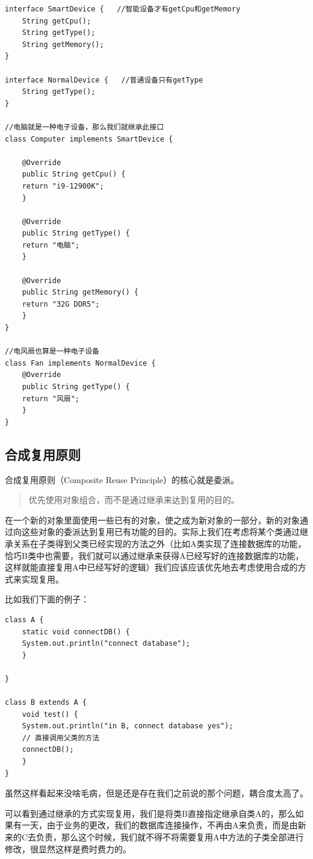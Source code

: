 \documentclass[11pt]{article}
\begin{document}
\begin{verbatim}
interface SmartDevice {   //智能设备才有getCpu和getMemory
    String getCpu();
    String getType();
    String getMemory();
}

interface NormalDevice {   //普通设备只有getType
    String getType();
}

//电脑就是一种电子设备，那么我们就继承此接口
class Computer implements SmartDevice {

    @Override
    public String getCpu() {
	return "i9-12900K";
    }

    @Override
    public String getType() {
	return "电脑";
    }

    @Override
    public String getMemory() {
	return "32G DDR5";
    }
}

//电风扇也算是一种电子设备
class Fan implements NormalDevice {
    @Override
    public String getType() {
	return "风扇";
    }
}
\end{verbatim}

\subsection{合成复用原则}
\label{sec:orga776f23}
合成复用原则（Composite Reuse Principle）的核心就是委派。

\begin{quote}
优先使用对象组合，而不是通过继承来达到复用的目的。
\end{quote}

在一个新的对象里面使用一些已有的对象，使之成为新对象的一部分，新的对象通过向这些对象的委派达到复用已有功能的目的。实际上我们在考虑将某个类通过继承关系在子类得到父类已经实现的方法之外（比如A类实现了连接数据库的功能，恰巧B类中也需要，我们就可以通过继承来获得A已经写好的连接数据库的功能，这样就能直接复用A中已经写好的逻辑）我们应该应该优先地去考虑使用合成的方式来实现复用。

比如我们下面的例子：
\begin{verbatim}
class A {
    static void connectDB() {
	System.out.println("connect database");
    }

}

class B extends A {
    void test() {
	System.out.println("in B, connect database yes");
	// 直接调用父类的方法
	connectDB();
    }
}
\end{verbatim}
虽然这样看起来没啥毛病，但是还是存在我们之前说的那个问题，耦合度太高了。

可以看到通过继承的方式实现复用，我们是将类B直接指定继承自类A的，那么如果有一天，由于业务的更改，我们的数据库连接操作，不再由A来负责，而是由新来的C去负责，那么这个时候，我们就不得不将需要复用A中方法的子类全部进行修改，很显然这样是费时费力的。
\end{document}
